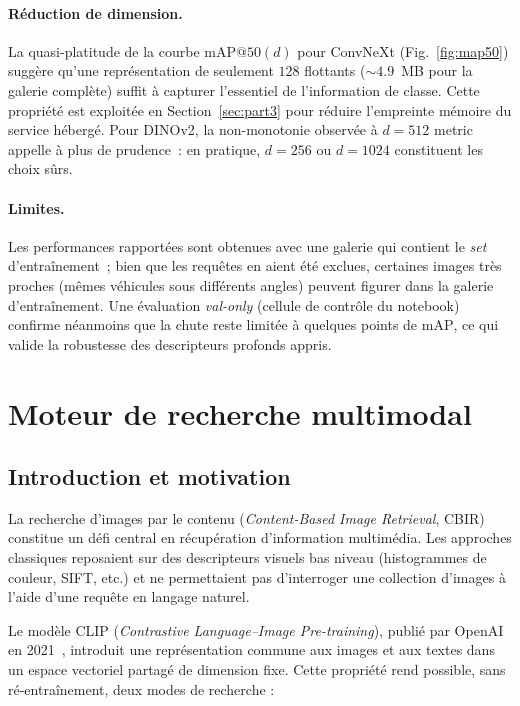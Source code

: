\documentclass[a4paper,11pt]{article}
\begin{document}
\paragraph{Réduction de dimension.}
La quasi-platitude de la courbe $\text{mAP}@50(d)$ pour ConvNeXt
(Fig.~\ref{fig:map50}) suggère qu'une représentation de seulement
$128$ flottants ($\sim 4.9$~MB pour la galerie complète) suffit à
capturer l'essentiel de l'information de classe. Cette propriété est
exploitée en Section~\ref{sec:part3} pour réduire l'empreinte mémoire du
service hébergé. Pour DINOv2, la non-monotonie observée à $d=512$
metric appelle à plus de prudence~: en pratique, $d=256$ ou $d=1024$
constituent les choix sûrs.

\paragraph{Limites.}
Les performances rapportées sont obtenues avec une galerie qui contient
le \textit{set} d'entraînement~; bien que les requêtes en aient été
exclues, certaines images très proches (mêmes véhicules sous
différents angles) peuvent figurer dans la galerie d'entraînement. Une
évaluation \textit{val-only} (cellule de contrôle du notebook) confirme
néanmoins que la chute reste limitée à quelques points de $\text{mAP}$,
ce qui valide la robustesse des descripteurs profonds appris.

\newpage
\section{Moteur de recherche multimodal}
\label{sec:part2}
\subsection{Introduction et motivation}
 
La recherche d'images par le contenu (\textit{Content-Based Image Retrieval}, CBIR)
constitue un défi central en récupération d'information multimédia.
Les approches classiques reposaient sur des descripteurs visuels bas niveau
(histogrammes de couleur, SIFT, etc.) et ne permettaient pas d'interroger
une collection d'images à l'aide d'une requête en langage naturel.
 
Le modèle CLIP (\textit{Contrastive Language–Image Pre-training}), publié par
OpenAI en 2021~\cite{radford2021clip}, introduit une représentation commune
aux images et aux textes dans un espace vectoriel partagé de dimension fixe.
Cette propriété rend possible, sans ré-entraînement, deux modes de recherche :
 
\end{document}

